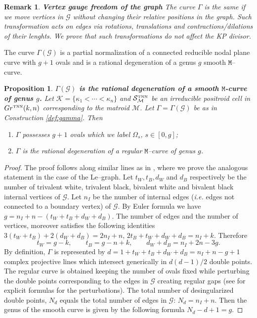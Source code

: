 \documentclass[11pt]{amsart}
\theoremstyle{plain}
\numberwithin{equation}{section}
\newtheorem{proposition}[theorem]{Proposition}
\newtheorem{remark}{Remark}[subsection]
\def \GTNN {{Gr^{\mbox{\tiny TNN}} (k,n)}}
\begin{document}
\begin{remark}\label{rem:gauge_vertices}\textbf{Vertex gauge freedom of the graph} The curve $\Gamma$ is the same if we move vertices in $\mathcal G$ without changing their relative positions in the graph. Such transformation acts on edges via rotations, translations and contractions/dilations of their lenghts. We prove that such transformations do not affect the KP divisor.
\end{remark}

The curve $\Gamma(\mathcal G)$ is a partial normalization \cite{ACG} of a connected reducible nodal plane curve with $g+1$ ovals 
and is a rational degeneration of a genus $g$ smooth $\mathtt M$--curve. 

\begin{proposition}\textbf{$\Gamma(\mathcal G)$  is the rational degeneration of a smooth $\mathtt M$-curve of genus $g$.}
Let ${\mathcal K} = \{ \kappa_1 < \cdots < \kappa_n\}$ and ${\mathcal S}^{\mbox {\tiny TNN}}_{{\mathcal M}}$ be an irreducible positroid cell in $\GTNN$ corresponding to the matroid ${\mathcal M}$. Let $\Gamma=\Gamma(\mathcal G)$ be as in Construction \ref{def:gamma}. Then
\begin{enumerate}
\item $\Gamma$ possesses $g+1$ ovals which we label $\Omega_s$, $s\in [0,g]$; 
\item $\Gamma$ is the rational degeneration of a regular $\mathtt M$--curve of genus $g$.
\end{enumerate}
\end{proposition}

\begin{proof}
The proof follows along similar lines as in \cite{AG3}, where we prove the analogous statement in the case of the Le--graph.
Let $t_W, t_B, d_W$ and $d_B$ respectively be the number of trivalent white, trivalent black, bivalent white and bivalent black internal vertices of ${\mathcal G}$. Let $n_I$ be the number of internal edges ({\sl i.e.} edges not connected to a boundary vertex) of ${\mathcal G}$. By Euler formula we have $g = n_I +n -(t_W + t_B+d_W+d_B)$.
The number of edges and the number of vertices, moreover satisfies the following identities
$3(t_W+t_B)+2(d_W+d_B) = 2n_I +n$, $2t_B+ t_W+d_W+d_B =n_I+k$.
Therefore 
\begin{equation}\label{eq:vertex_type}
t_W = g-k, \qquad t_B = g-n+k, \qquad d_W+d_B= n_I+ 2n - 3g.
\end{equation}
By definition, $\Gamma$ is represented by $d= 1+t_W + t_B+d_W+d_B =n_I+n-g+1$ complex projective lines which intersect generically in $d(d-1)/2$ double points. The regular curve is obtained keeping  the number of ovals fixed while perturbing the double points corresponding to the edges in $\mathcal G$ creating regular gaps (see \cite{AG3} for explicit formulas for the perturbations). The total number of desingularized double points, $N_d$ equals the total number of edges in $\mathcal G$: $N_d =n_I+n$. 
Then the genus of the smooth curve is given by the following formula $N_d - d+1 = g $.
\end{proof}
\end{document}
